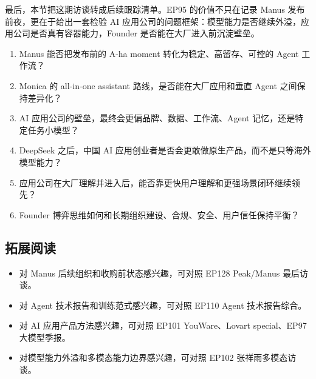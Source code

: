 \documentclass[a4paper]{article}
\begin{document}
最后，本节把这期访谈转成后续跟踪清单。EP95 的价值不只在记录 Manus 发布前夜，更在于给出一套检验 AI 应用公司的问题框架：模型能力是否继续外溢，应用公司是否真有容器能力，Founder 是否能在大厂进入前沉淀壁垒。

\begin{enumerate}
\item Manus 能否把发布前的 A-ha moment 转化为稳定、高留存、可控的 Agent 工作流？
\item Monica 的 all-in-one assistant 路线，是否能在大厂应用和垂直 Agent 之间保持差异化？
\item AI 应用公司的壁垒，最终会更偏品牌、数据、工作流、Agent 记忆，还是特定任务小模型？
\item DeepSeek 之后，中国 AI 应用创业者是否会更敢做原生产品，而不是只等海外模型能力？
\item 应用公司在大厂理解并进入后，能否靠更快用户理解和更强场景闭环继续领先？
\item Founder 博弈思维如何和长期组织建设、合规、安全、用户信任保持平衡？
\end{enumerate}

\subsection{拓展阅读}

\begin{itemize}
\item 对 Manus 后续组织和收购前状态感兴趣，可对照 EP128 Peak/Manus 最后访谈。
\item 对 Agent 技术报告和训练范式感兴趣，可对照 EP110 Agent 技术报告综合。
\item 对 AI 应用产品方法感兴趣，可对照 EP101 YouWare、Lovart special、EP97 大模型季报。
\item 对模型能力外溢和多模态能力边界感兴趣，可对照 EP102 张祥雨多模态访谈。
\end{itemize}
\end{document}
